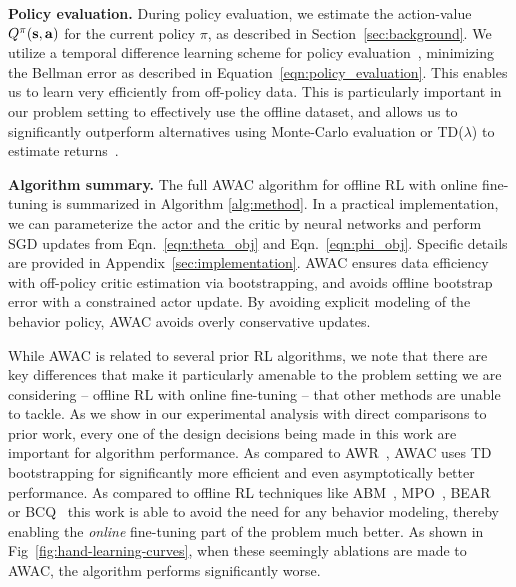 \documentclass[conference]{IEEEtran}
\begin{document}
\noindent \textbf{Policy evaluation.} During policy evaluation, we estimate the action-value $Q^{\pi}(\mathbf{s},\mathbf{a})$ for the current policy $\pi$, as described in Section~\ref{sec:background}. We utilize a temporal difference learning scheme for policy evaluation~\citep{haarnoja2018sac, fujimoto2018td3}, minimizing the Bellman error as described in Equation~\ref{eqn:policy_evaluation}. This enables us to learn very efficiently from off-policy data. This is particularly important in our problem setting to effectively use the offline dataset, and allows us to significantly outperform alternatives using Monte-Carlo evaluation or TD($\lambda$) to estimate returns~\citep{peng2019awr}.  



\noindent \textbf{Algorithm summary.} The full AWAC algorithm for offline RL with online fine-tuning is summarized in Algorithm \ref{alg:method}. In a practical implementation, we can parameterize the actor and the critic by neural networks and perform SGD updates from Eqn.~\ref{eqn:theta_obj} and Eqn.~\ref{eqn:phi_obj}. Specific details are provided in Appendix~\ref{sec:implementation}. AWAC ensures data efficiency with off-policy critic estimation via bootstrapping, and avoids offline bootstrap error with a constrained actor update. By avoiding explicit modeling of the behavior policy, AWAC avoids overly conservative updates.  


While AWAC is related to several prior RL algorithms, we note that there are key differences that make it particularly amenable to the problem setting we are considering -- offline RL with online fine-tuning -- that other methods are unable to tackle.
As we show in our experimental analysis with direct comparisons to prior work, every one of the design decisions being made in this work are important for algorithm performance. As compared to AWR~\citep{peng2019awr}, AWAC uses TD bootstrapping for significantly more efficient and even asymptotically better performance. As compared to offline RL techniques like ABM~\citep{siegel2020abm}, MPO~\citep{we2018mpo}, BEAR ~\citep{kumar19bear} or BCQ~\citep{fujimoto19bcq} this work is able to avoid the need for any behavior modeling, thereby enabling the \emph{online} fine-tuning part of the problem much better. As shown in Fig~\ref{fig:hand-learning-curves}, when these seemingly ablations are made to AWAC, the algorithm performs significantly worse.


\end{document}
